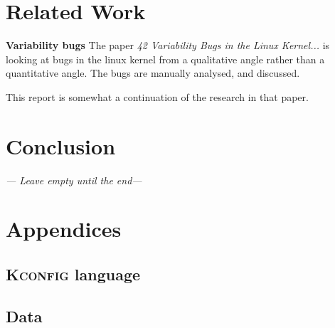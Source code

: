 \documentclass[a4paper,11pt]{report}
\begin{document}




\newpage
\chapter{Related Work}

\textbf{Variability bugs}
The paper \emph{42 Variability Bugs in the Linux Kernel...} is looking at bugs 
in the linux kernel from a qualitative angle rather than a quantitative angle. 
The bugs are manually analysed, and discussed.

This report is somewhat a continuation of the research in that paper.

\newpage
\chapter{Conclusion}
\emph{--- Leave empty until the end---}




\newpage




            \newpage
            \chapter{Appendices}


            \section{\textsc{Kconfig} language}
            \label{app:kconfig}


            \section{Data}
\end{document}
